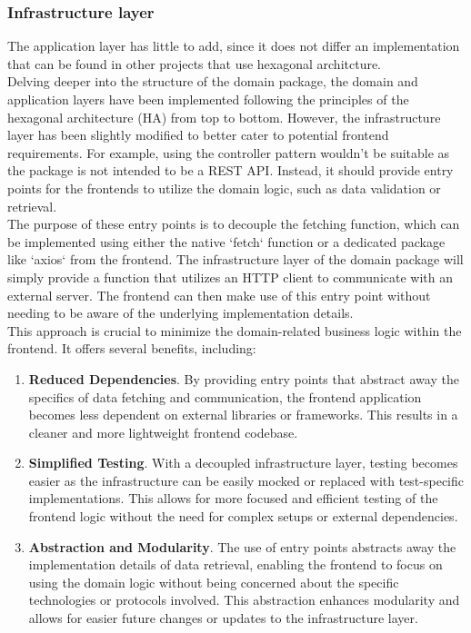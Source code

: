 \documentclass[../design.tex]{subfiles}
\begin{document}
\subsubsection{Infrastructure layer}
The application layer has little to add, since it does not differ an
implementation that can be found in other projects that use hexagonal
architcture.
\\[8pt]
Delving deeper into the structure of the domain package, the domain and
application layers have been implemented following the principles of the
hexagonal architecture (HA) from top to bottom. However, the infrastructure
layer has been slightly modified to better cater to potential frontend
requirements. For example, using the controller pattern wouldn't be suitable as
the package is not intended to be a REST API. Instead, it should provide entry
points for the frontends to utilize the domain logic, such as data validation or
retrieval.
\\
The purpose of these entry points is to decouple the fetching function, which
can be implemented using either the native `fetch` function or a dedicated
package like `axios` from the frontend. The infrastructure layer of the domain
package will simply provide a function that utilizes an HTTP client to
communicate with an external server. The frontend can then make use of this
entry point without needing to be aware of the underlying implementation
details.
\\
This approach is crucial to minimize the domain-related business logic within
the frontend. It offers several benefits, including:
\begin{enumerate}
	\item\textbf{Reduced Dependencies}. By providing entry points that abstract away the
	specifics of data fetching and communication, the frontend application becomes
	less dependent on external libraries or frameworks. This results in a
	cleaner and more lightweight frontend codebase.
	\item\textbf{Simplified Testing}. With a decoupled infrastructure layer, testing
	becomes easier as the infrastructure can be easily mocked or replaced with
	test-specific implementations. This allows for more focused and efficient
	testing of the frontend logic without the need for complex setups or
	external dependencies.
	\item\textbf{Abstraction and Modularity}. The use of entry points abstracts away the
	implementation details of data retrieval, enabling the frontend to focus
	on using the domain logic without being concerned about the specific
	technologies or protocols involved. This abstraction enhances modularity
	and allows for easier future changes or updates to the infrastructure
	layer.
\end{enumerate}
\end{document}
